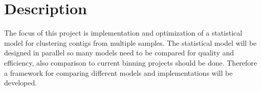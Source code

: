 \documentclass{article}
\begin{document}
\section*{Description}
The focus of this project is implementation and optimization of a statistical model for clustering contigs from multiple samples. The statistical model will be designed in parallel so many models need to be compared for quality and efficiency, also comparison to current binning projects should be done. Therefore a framework for comparing different models and implementations will be developed. 
\end{document}

